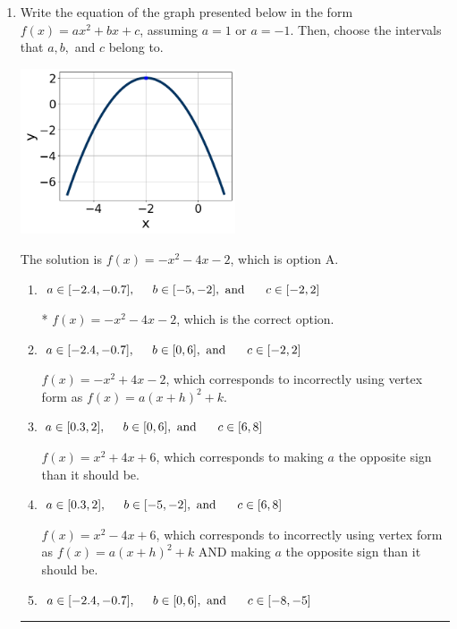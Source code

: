 \documentclass{extbook}[14pt]
\newcommand{\litem}[1]{\item #1

\rule{\textwidth}{0.4pt}}
\begin{document}
\begin{enumerate}\litem{
Write the equation of the graph presented below in the form $f(x)=ax^2+bx+c$, assuming  $a=1$ or $a=-1$. Then, choose the intervals that $a, b,$ and $c$ belong to.

\begin{center}
    \includegraphics[width=0.5\textwidth]{../Figures/quadraticGraphToEquationCopyA.png}
\end{center}



The solution is \( f(x) = -x^{2} -4 x -2 \), which is option A.\begin{enumerate}[label=\Alph*.]
\item \( a \in [-2.4, -0.7], \hspace*{5mm} b \in [-5, -2], \text{ and } \hspace*{5mm} c \in [-2, 2] \)

* $f(x)=-x^{2} -4 x -2$, which is the correct option.
\item \( a \in [-2.4, -0.7], \hspace*{5mm} b \in [0, 6], \text{ and } \hspace*{5mm} c \in [-2, 2] \)

$f(x)=-x^{2} +4 x -2$, which corresponds to incorrectly using vertex form as $f(x) = a(x+h)^2+k$.
\item \( a \in [0.3, 2], \hspace*{5mm} b \in [0, 6], \text{ and } \hspace*{5mm} c \in [6, 8] \)

$f(x)=x^{2} +4 x + 6$, which corresponds to making $a$ the opposite sign than it should be.
\item \( a \in [0.3, 2], \hspace*{5mm} b \in [-5, -2], \text{ and } \hspace*{5mm} c \in [6, 8] \)

$f(x)=x^{2} -4 x + 6$, which corresponds to incorrectly using vertex form as $f(x) = a(x+h)^2+k$ AND making $a$ the opposite sign than it should be.
\item \( a \in [-2.4, -0.7], \hspace*{5mm} b \in [0, 6], \text{ and } \hspace*{5mm} c \in [-8, -5] \)


\end{enumerate}}
\end{enumerate}
\end{document}
